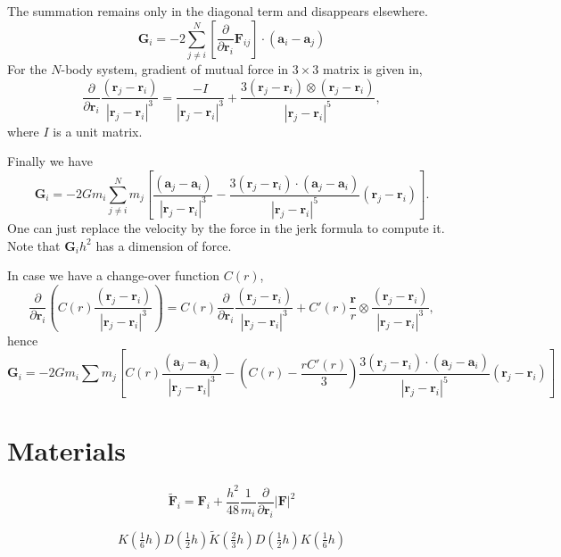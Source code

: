 \documentclass[11pt]{jsarticle}
\begin{document}
The summation remains only in the diagonal term and disappears elsewhere.
\begin{equation}
\bm G_i = -2 \sum_{j \neq i}^N \left[ \frac{\partial}{\partial \bm r_i} \bm F_{ij} \right] \cdot \left(\bm a_i - \bm a_j\right)
\end{equation}
For the $N$-body system, gradient of mutual force in $3 \times 3$ matrix is given in,
\begin{equation}
\frac{\partial}{\partial \bm r_i} \frac{(\bm r_j - \bm r_i)}{| \bm r_j - \bm r_i |^3}
=
\frac{-I}{| \bm r_j - \bm r_i |^3}
+
\frac{3 (\bm r_j - \bm r_i) \otimes (\bm r_j - \bm r_i)}{| \bm r_j - \bm r_i |^5},
\end{equation}
where $I$ is a unit matrix.

Finally we have
\begin{equation}
\bm G_i = -2 G m_i \sum_{j \neq i}^N 
  m_j \left[ \frac{(\bm a_j - \bm a_i)}{| \bm r_j - \bm r_i |^3} - \frac{3 (\bm r_j - \bm r_i) \cdot (\bm a_j - \bm a_i)}{| \bm r_j - \bm r_i |^5} (\bm r_j - \bm r_i) \right].
\end{equation}
One can just replace the velocity by the force in the jerk formula to compute it.
Note that $\bm G_i h^2$ has a dimension of force.

In case we have a change-over function $C(r)$,
\begin{equation}
\frac{\partial}{\partial \bm r_i} \left( C(r) \frac{(\bm r_j - \bm r_i)}{| \bm r_j - \bm r_i |^3} \right)
=
C(r) \frac{\partial}{\partial \bm r_i} \frac{(\bm r_j - \bm r_i)}{| \bm r_j - \bm r_i |^3}
+ C'(r) \frac{\bm r}{r} \otimes \frac{(\bm r_j - \bm r_i)}{| \bm r_j - \bm r_i |^3},
\end{equation}
hence
\begin{equation}
\bm G_i = -2Gm_i \sum m_j \left[
	C(r) \frac{(\bm a_j - \bm a_i)}{| \bm r_j - \bm r_i |^3}
	- \left( C(r) - \frac{r C'(r)}{3} \right)
	\frac{3 (\bm r_j - \bm r_i) \cdot (\bm a_j - \bm a_i)}{| \bm r_j - \bm r_i |^5} (\bm r_j - \bm r_i)
	\right]
\end{equation}

\section{Materials}
\[
\tilde{ \bm F}_i = \bm F_i + \frac{h^2}{48} \frac{1}{m_i} \frac{\partial}{\partial \bm r_i} \left| \bm F \right|^2
\]

\[
	K(\tfrac16 h) D(\tfrac12 h) \tilde K(\tfrac23 h) D(\tfrac12 h) K(\tfrac16 h)
\]
\end{document}
